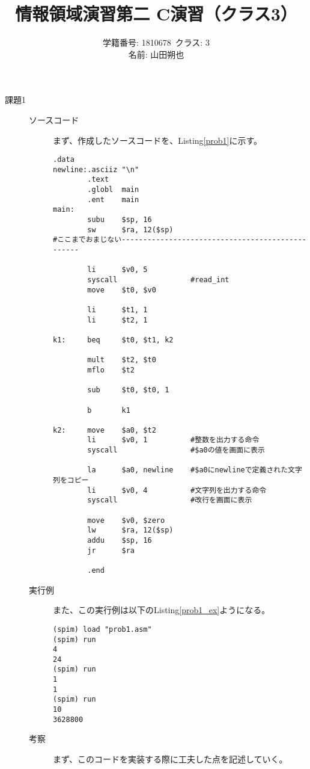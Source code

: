 \documentclass{jsarticle}
\title{情報領域演習第二 C演習（クラス3）}
\author{学籍番号: 1810678\ クラス: 3 \\
        名前: 山田朔也}
\begin{document}
    \maketitle
    \begin{description}
        \item[課題1]
        \begin{description}
            \item[ソースコード]
            まず、作成したソースコードを、Listing\ref{prob1}に示す。
            \begin{lstlisting}[caption=課題1のソースコード, label=prob1]
        .data
newline:.asciiz "\n"
        .text
        .globl  main
        .ent    main
main:
        subu    $sp, 16
        sw      $ra, 12($sp)
#ここまでおまじない-------------------------------------------------

        li      $v0, 5
        syscall                 #read_int
        move    $t0, $v0

        li      $t1, 1
        li      $t2, 1

k1:     beq     $t0, $t1, k2

        mult    $t2, $t0
        mflo    $t2

        sub     $t0, $t0, 1

        b       k1

k2:     move    $a0, $t2
        li      $v0, 1          #整数を出力する命令
        syscall                 #$a0の値を画面に表示

        la      $a0, newline    #$a0にnewlineで定義された文字列をコピー
        li      $v0, 4          #文字列を出力する命令
        syscall                 #改行を画面に表示

        move    $v0, $zero
        lw      $ra, 12($sp)
        addu    $sp, 16
        jr      $ra

        .end
            \end{lstlisting}

            \item[実行例]
            また、この実行例は以下のListing\ref{prob1_ex}ようになる。
            \begin{lstlisting}[caption=課題1の実行例, label=prob1_ex]
(spim) load "prob1.asm"
(spim) run
4
24
(spim) run
1
1
(spim) run
10
3628800
            \end{lstlisting}

            \item[考察]
            まず、このコードを実装する際に工夫した点を記述していく。


\end{description}
\end{description}
\end{document}
